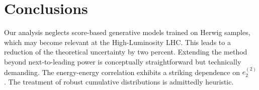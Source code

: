 \section{Conclusions}\label{sec:conclusions}

Our analysis neglects score-based generative models trained on Herwig
samples, which may become relevant at the High-Luminosity LHC. This
leads to a reduction of the theoretical uncertainty by two percent.
Extending the method beyond next-to-leading power is conceptually
straightforward but technically demanding. The energy-energy correlation
exhibits a striking dependence on $e_2^{(2)}$. The treatment of robust
cumulative distributions is admittedly heuristic.

